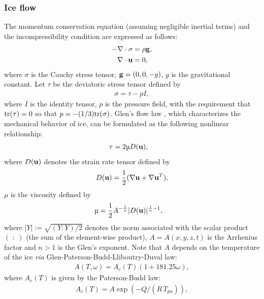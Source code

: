 \documentclass[gmd]{copernicus}
\begin{document}
\subsubsection{Ice flow}
\label{phys_ice_dynamics}
 
The momentum conservation equation (assuming negligible inertial terms) and the incompressibility condition are expressed as follows:
\begin{align}
- \nabla \cdot \sigma  & =  \rho  {\bf g},  \label{eq_conservation}  \\
\nabla \cdot {\bf u}  & = 0,                   \label{eq_incomp} 
\end{align}  
where $\sigma$ is the Cauchy stress tensor, ${\bf g}= (0,0,-g)$, $g$ is the gravitational constant. Let $\tau$ be the deviatoric stress tensor defined by 
\begin{align}
\sigma = \tau  -  p I , \label{eq_dev}  
\end{align}  
where $I$ is the identity tensor, $p$ is the pressure field, with the requirement that ${\rm tr} (\tau) = 0 $ so that $p = -(1/3) {\rm tr} (\sigma)$. Glen's flow law \citep{Glen1953}, which characterizes the mechanical behavior of ice, can be formulated as the following nonlinear relationship:
\begin{align} 
\tau & = 2 \mu {D} ({\bf u}), \label{eq_tau} 
\end{align}  
where ${D} ({\bf u})$ denotes the strain rate tensor defined by 
\begin{align} 
{D} ({\bf u}) = \frac12 ( \nabla {\bf u} +  \nabla {\bf u}^T ),
\label{def_varepsilon}  
\end{align} 
$\mu$ is the viscosity defined by 
\begin{align}  
\mu & = \frac12  A^{-\frac{1}{n}} | D ({\bf u}) |^{\frac{1}{n}-1},
\label{eq_mu}  
\end{align} 
where $ |Y|  := \sqrt{(Y : Y) / 2 }$ denotes the norm associated with the scalar product $(\; : \;)$ (the sum of the element-wise product), $A=A(x,y,z,t)$ is the Arrhenius factor and $n>1$ is the Glen's exponent. Note that $A$ depends on the temperature of the ice \citep{Paterson1994} \textit{via} Glen-Paterson-Budd-Lliboutry-Duval law:
\begin{align}
A(T,\omega)= A_c(T)(1+181.25 \omega), \label{defA}
\end{align}
where $A_c(T)$ is given by the Paterson-Budd law:
\begin{align}
A_c(T)= A \exp{ ( -Q / (R \, T_{pa}) )},
\end{align}
\end{document}
